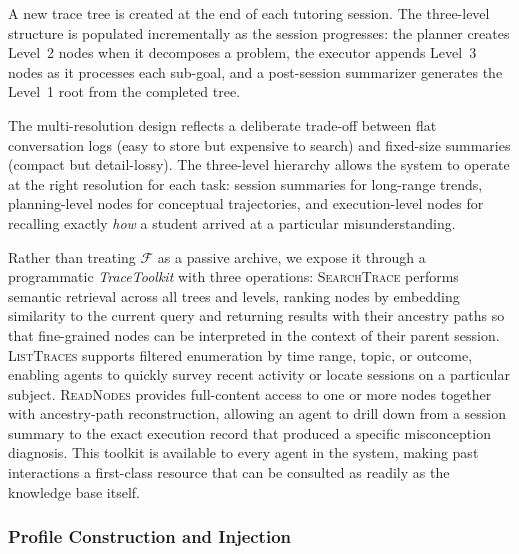 A new trace tree is created at the end of each tutoring session.
The three-level structure is populated incrementally as the session progresses: the planner creates Level~2 nodes when it decomposes a problem, the executor appends Level~3 nodes as it processes each sub-goal, and a post-session summarizer generates the Level~1 root from the completed tree.

The multi-resolution design reflects a deliberate trade-off between flat conversation logs (easy to store but expensive to search) and fixed-size summaries (compact but detail-lossy).
The three-level hierarchy allows the system to operate at the right resolution for each task: session summaries for long-range trends, planning-level nodes for conceptual trajectories, and execution-level nodes for recalling exactly \emph{how} a student arrived at a particular misunderstanding.

Rather than treating $\mathcal{F}$ as a passive archive, we expose it through a programmatic \emph{TraceToolkit} with three operations:
\textsc{SearchTrace} performs semantic retrieval across all trees and levels, ranking nodes by embedding similarity to the current query and returning results with their ancestry paths so that fine-grained nodes can be interpreted in the context of their parent session.
\textsc{ListTraces} supports filtered enumeration by time range, topic, or outcome, enabling agents to quickly survey recent activity or locate sessions on a particular subject.
\textsc{ReadNodes} provides full-content access to one or more nodes together with ancestry-path reconstruction, allowing an agent to drill down from a session summary to the exact execution record that produced a specific misconception diagnosis.
This toolkit is available to every agent in the system, making past interactions a first-class resource that can be consulted as readily as the knowledge base itself.

\subsubsection{Profile Construction and Injection}
\label{sec:injection}

